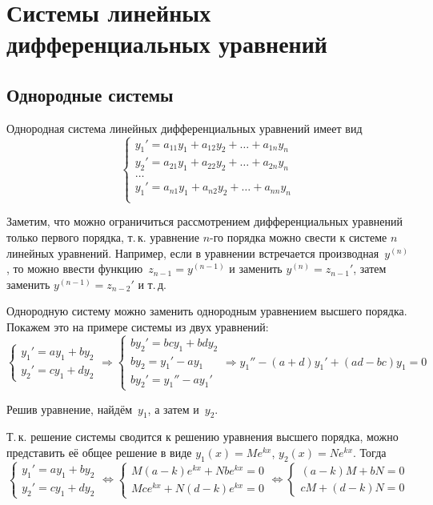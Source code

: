 \section{Системы линейных дифференциальных уравнений}
\subsection{Однородные системы}
Однородная система линейных дифференциальных уравнений имеет вид
\begin{equation*}
\begin{cases}
y_1' = a_{11} y_1 + a_{12} y_2 + \ldots + a_{1n} y_n \\
y_2' = a_{21} y_1 + a_{22} y_2 + \ldots + a_{2n} y_n \\
\ldots \\
y_1' = a_{n1} y_1 + a_{n2} y_2 + \ldots + a_{nn} y_n \\
\end{cases}
\end{equation*}

Заметим, что можно ограничиться рассмотрением дифференциальных уравнений только первого порядка, т.\,к. уравнение $n$-го порядка можно свести к системе $n$ линейных уравнений.
Например, если в уравнении встречается производная~$y^{(n)}$, то можно ввести функцию~$z_{n-1} = y^{(n-1)}$ и заменить $y^{(n)} = z_{n-1}'$, затем заменить $y^{(n-1)} = z_{n-2}'$ и т.\,д.

Однородную систему можно заменить однородным уравнением высшего порядка.
Покажем это на примере системы из двух уравнений:
\begin{equation*}
\begin{cases}
y_1' = ay_1 + by_2 \\
y_2' = cy_1 + dy_2
\end{cases}
\Rightarrow
\begin{cases}
by_2' = bcy_1 + bdy_2 \\
by_2 = y_1' - ay_1 \\
by_2' = y_1'' - ay_1'
\end{cases}
\Rightarrow y_1'' - (a + d)y_1' + (ad - bc) y_1 = 0
\end{equation*}

Решив уравнение, найдём~$y_1$, а затем и~$y_2$.

Т.\,к. решение системы сводится к решению уравнения высшего порядка, можно представить её общее решение в виде $y_1(x) = M e^{kx}$, $y_2(x) = N e^{kx}$.
Тогда
\begin{equation}
\label{eq:homogeneous_system_after_substitution}
\begin{cases}
y_1' = ay_1 + by_2 \\
y_2' = cy_1 + dy_2
\end{cases}
\Leftrightarrow
\begin{cases}
M (a - k) e^{kx} + N b e^{kx} = 0 \\
M c e^{kx} + N (d - k) e^{kx} = 0
\end{cases}
\Leftrightarrow
\begin{cases}
(a - k) M + b N = 0 \\
c M + (d - k) N = 0
\end{cases}
\end{equation}

